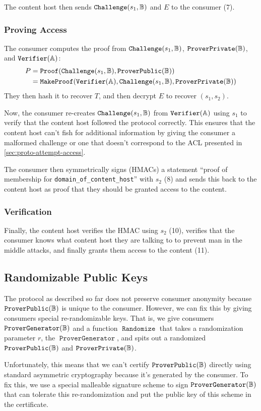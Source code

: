 \documentclass[pdftex,12pt,a4papaer,twoside,notitlepage]{report}
\DeclareMathOperator{\PvecG}{\mathtt{ProverGenerator}}
\DeclareMathOperator{\Proof}{\mathtt{Proof}}
\DeclareMathOperator{\mProof}{\mathtt{MakeProof}}
\DeclareMathOperator{\rand}{\mathtt{Randomize}}
\begin{document}
The content host then sends $\operatorname{\mathtt{Challenge}}(s_1, \mathbb{B})$ and $E$ to the consumer (7).

\subsubsection{Proving Access}

The consumer computes the proof from $\operatorname{\mathtt{Challenge}}(s_1, \mathbb{B})$, $\operatorname{\mathtt{ProverPrivate}}(\mathbb{B})$, and $\operatorname{\mathtt{Verifier}}(\mathbb{A})$:
\begin{align*}
  P &= \Proof(\Cv, \Pv) \\
    &= \mProof(\Vv, \Cv, \Sv)
\end{align*}
They then hash it to recover $T$, and then decrypt $E$ to recover $(s_1, s_2)$.

Now, the consumer re-creates $\operatorname{\mathtt{Challenge}}(s_1, \mathbb{B})$ from $\operatorname{\mathtt{Verifier}}(\mathbb{A})$ using $s_1$ to verify that the
content host followed the protocol correctly. This ensures that the content host
can't fish for additional information by giving the consumer a malformed
challenge or one that doesn't correspond to the ACL presented in
\cref{sec:proto-attempt-access}.

The consumer then symmetrically signs (HMACs) a statement ``proof of membership
for \texttt{domain\_of\_content\_host}'' with $s_2$ (8) and sends this back to
the content host as proof that they should be granted access to the content.

\subsubsection{Verification}

Finally, the content host verifies the HMAC using $s_2$ (10), verifies that the
consumer knows what content host they are talking to to prevent man in the
middle attacks, and finally grants them access to the content (11).

\subsection{Randomizable Public Keys}
\label{sec:proto-random-key}

\sloppy The protocol as described so far does not preserve consumer anonymity
because $\operatorname{\mathtt{ProverPublic}}(\mathbb{B})$ is unique to the consumer. However, we can fix this by giving
consumers special re-randomizable keys. That is, we give consumers $\Pvg$ and a
function $\rand$ that takes a randomization parameter $r$, the $\PvecG$, and
spits out a randomized $\operatorname{\mathtt{ProverPublic}}(\mathbb{B})$ and $\operatorname{\mathtt{ProverPrivate}}(\mathbb{B})$.

Unfortunately, this means that we can't certify $\operatorname{\mathtt{ProverPublic}}(\mathbb{B})$ directly using standard
asymmetric cryptography because it's generated by the consumer. To fix this, we
use a special malleable signature scheme to sign $\Pvg$ that can tolerate this
re-randomization and put the public key of this scheme in the certificate.
\end{document}
